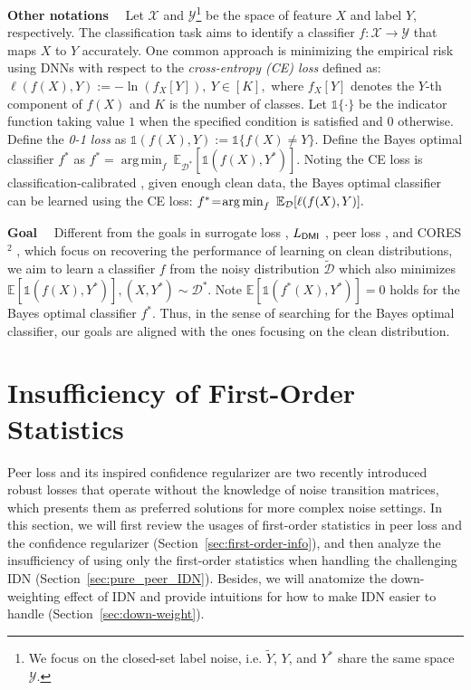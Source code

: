 \documentclass[final]{cvpr}
\DeclareMathOperator*{\argmin}{arg\,min}
\newcommand{\BR}{\mathds 1}
\newcommand{\E}{\mathbb E}
\begin{document}
\noindent\textbf{Other notations}~~
Let $\mathcal X$ and $\mathcal Y$\footnote{We focus on the closed-set label noise, i.e. $\widetilde Y$, $Y$, and $Y^*$ share the same space $\mathcal Y$.} be the space of feature $X$ and label $Y$, respectively. 
The classification task aims to identify a classifier $f: \mathcal X \rightarrow \mathcal Y$ that maps $X$ to $Y$ accurately.
One common approach is minimizing the empirical risk using DNNs with respect to the \emph{cross-entropy (CE) loss} defined as:
$
    \ell(f(X),Y) := - \ln(f_X[Y]), ~ Y \in [K],
$
where $f_X[Y]$ denotes the $Y$-th component of $f(X)$ and $K$ is the number of classes.
Let $\BR\{\cdot\}$ be the indicator function taking value $1$ when the specified condition is satisfied and $0$ otherwise. Define the \emph{0-1 loss} as 
$\BR{(f(X),Y)}:=\BR\{f(X) \ne Y\}.$
Define the Bayes optimal classifier $f^*$ as 
$
f^* = \argmin_{f} ~\E_{\mathcal D^*}[\BR(f(X),Y^*)].
$
Noting the CE loss is classification-calibrated \cite{bartlett2006convexity}, given enough clean data, the Bayes optimal classifier can be learned using the CE loss: 
$
f^* \hspace{-2pt}=\hspace{-2pt} \argmin_{f} ~\E_{\mathcal D}[\ell(f(X),Y)].
$

\noindent\textbf{Goal}~~
Different from the goals in surrogate loss \cite{natarajan2013learning}, $L_{\sf{DMI}}$ \cite{xu2019l_dmi}, peer loss \cite{liu2019peer}, and CORES$^2$ \cite{sieve2020}, which focus on recovering the performance of learning on clean distributions, we aim to learn a classifier $f$ from the noisy distribution $\widetilde{\mathcal D}$ which also minimizes $\E [\BR(f(X), Y^*)], (X,Y^*)\sim \mathcal D^*$. 
Note $\E[\BR(f^*(X), Y^*)] = 0$ holds for the Bayes optimal classifier $f^*$. Thus, in the sense of searching for the Bayes optimal classifier, our goals are aligned with the ones focusing on the clean distribution. 
 \section{Insufficiency of First-Order Statistics}\label{sec:cal}
Peer loss \cite{liu2019peer} and its inspired confidence regularizer \cite{sieve2020} are two recently introduced robust losses that operate without the knowledge of noise transition matrices, which presents them as preferred solutions for more complex noise settings. 
In this section, we will first review the usages of first-order statistics in peer loss and the confidence regularizer (Section~\ref{sec:first-order-info}), and then analyze the insufficiency of using only the first-order statistics when handling the challenging IDN (Section~\ref{sec:pure_peer_IDN}).
Besides, we will anatomize the down-weighting effect of IDN and provide intuitions for how to make IDN easier to handle (Section~\ref{sec:down-weight}).
\end{document}

